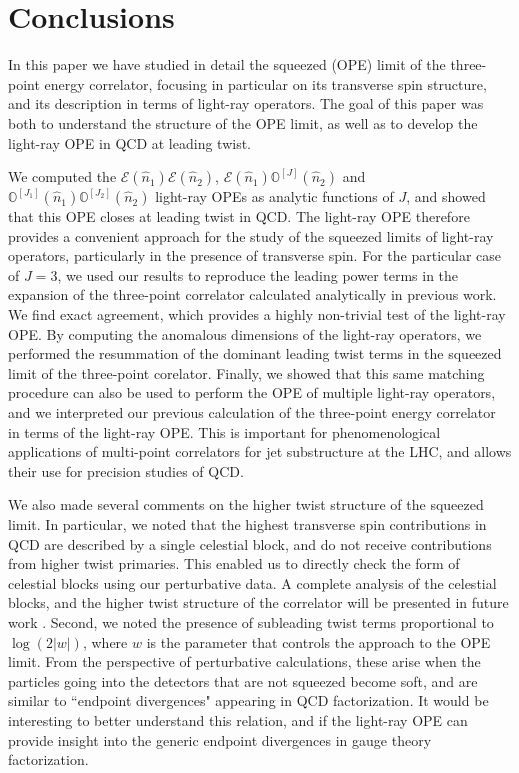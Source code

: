 \documentclass[letterpaper,11pt]{article}
\begin{document}
\section{Conclusions}\label{sec:conc}

In this paper we have studied in detail the squeezed (OPE) limit of the three-point energy correlator, focusing in particular on its transverse spin structure, and its description in terms of light-ray operators.  The goal of this paper was both to understand the structure of the OPE limit, as well as to develop the light-ray OPE in QCD at leading twist. 

We computed the $\mathcal{E}(\hat n_1) \mathcal{E}(\hat n_2)$, $\mathcal{E}(\hat n_1) \mathbb{O}^{[J]}(\hat n_2)$ and $\mathbb{O}^{[J_1]}(\hat n_1) \mathbb{O}^{[J_2]}(\hat n_2) $  light-ray OPEs as analytic functions of $J$, and showed that this OPE closes at leading twist in QCD. The light-ray OPE therefore provides a convenient approach for the study of the squeezed limits of light-ray operators, particularly in the presence of transverse spin. For the particular case of $J=3$, we used our results to reproduce the leading power terms in the expansion of the three-point correlator calculated analytically in previous work. We find exact agreement, which provides a highly non-trivial test of the light-ray OPE. 
By computing the anomalous dimensions of the light-ray operators, we performed the resummation of the dominant leading twist terms in the squeezed limit of the three-point corelator. Finally, we showed that this same matching procedure can also be used to perform the OPE of multiple light-ray operators, and we interpreted our previous calculation of the three-point energy correlator in terms of the light-ray OPE.  This is important for phenomenological applications of multi-point correlators for jet substructure at the LHC, and allows their use for precision studies of QCD. 


We also made several comments on the higher twist structure of the squeezed limit. In particular, we noted that the highest transverse spin contributions in QCD are described by a single celestial block, and do not receive contributions from higher twist primaries. This enabled us to directly check the form of celestial blocks using our perturbative data. A complete analysis of the celestial blocks, and the higher twist structure of the correlator will be presented in future work  \cite{blocks:forthcoming}. Second, we noted the presence of subleading twist terms proportional to $\log(2|w|)$, where $w$ is the parameter that controls the approach to the OPE limit. From the perspective of perturbative calculations, these arise when the particles going into the detectors that are not squeezed become soft, and are similar to ``endpoint divergences" appearing in QCD factorization. It would be interesting to better understand this relation, and if the light-ray OPE can provide insight into the generic endpoint divergences in gauge theory factorization.
\end{document}
